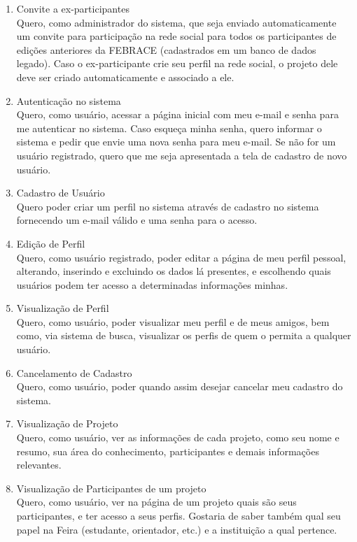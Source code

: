	\begin{enumerate}
    \item Convite a ex-participantes \\
      Quero, como administrador do sistema, que seja enviado automaticamente um convite para participação na rede social para todos os participantes de edições anteriores da FEBRACE (cadastrados em um banco de dados legado). Caso o ex-participante crie seu perfil na rede social, o projeto dele deve ser criado automaticamente e associado a ele.
    \item Autenticação no sistema \\
      Quero, como usuário, acessar a página inicial com meu e-mail e senha para me autenticar no sistema. Caso esqueça minha senha, quero informar o sistema e pedir que envie uma nova senha para meu e-mail. Se não for um usuário registrado, quero que me seja apresentada a tela de cadastro de novo usuário.
    \item Cadastro de Usuário \\
      Quero poder criar um perfil no sistema através de cadastro no sistema fornecendo um e-mail válido e uma senha para o acesso.
    \item Edição de Perfil \\
      Quero, como usuário registrado, poder editar a página de meu perfil pessoal, alterando, inserindo e excluindo os dados lá presentes, e escolhendo quais usuários podem ter acesso a determinadas informações minhas.
    \item Visualização de Perfil \\
      Quero, como usuário, poder visualizar meu perfil e de meus amigos, bem como, via sistema de busca, visualizar os perfis de quem o permita a qualquer usuário.
    \item Cancelamento de Cadastro \\
      Quero, como usuário, poder quando assim desejar cancelar meu cadastro do sistema.
    \item Visualização de Projeto \\
      Quero, como usuário, ver as informações de cada projeto, como seu nome e resumo, sua área do conhecimento, participantes e demais informações relevantes.
    \item Visualização de Participantes de um projeto \\
      Quero, como usuário, ver na página de um projeto quais são seus participantes, e ter acesso a seus perfis. Gostaria de saber também qual seu papel na Feira (estudante, orientador, etc.) e a instituição a qual pertence.

\end{enumerate}
